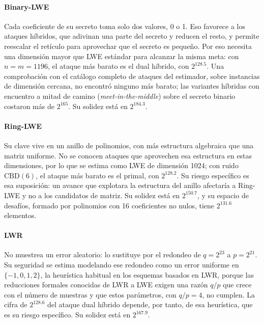 \paragraph{Binary-LWE}
Cada coeficiente de su secreto toma solo dos valores, 0 o 1. Eso favorece a los ataques híbridos, que adivinan una parte del secreto y reducen el resto, y permite reescalar el retículo para aprovechar que el secreto es pequeño. Por eso necesita una dimensión mayor que LWE estándar para alcanzar la misma meta: con $n = m = 1196$, el ataque más barato es el dual híbrido, con $2^{128.5}$. Una comprobación con el catálogo completo de ataques del estimador, sobre instancias de dimensión cercana, no encontró ninguno más barato; las variantes híbridas con encuentro a mitad de camino (\textit{meet-in-the-middle}) sobre el secreto binario costaron más de $2^{165}$. Su solidez está en $2^{184.3}$.

\paragraph{Ring-LWE}
Su clave vive en un anillo de polinomios, con más estructura algebraica que una matriz uniforme. No se conocen ataques que aprovechen esa estructura en estas dimensiones, por lo que se estima como LWE de dimensión 1024; con ruido $\mathrm{CBD}(6)$, el ataque más barato es el primal, con $2^{128.2}$. Su riesgo específico es esa suposición: un avance que explotara la estructura del anillo afectaría a Ring-LWE y no a los candidatos de matriz. Su solidez está en $2^{150.7}$, y su espacio de desafíos, formado por polinomios con 16 coeficientes no nulos, tiene $2^{131.6}$ elementos.

\paragraph{LWR}
No muestrea un error aleatorio: lo sustituye por el redondeo de $q = 2^{23}$ a $p = 2^{21}$. Su seguridad se estima modelando ese redondeo como un error uniforme en $\{-1, 0, 1, 2\}$, la heurística habitual en los esquemas basados en LWR, porque las reducciones formales conocidas de LWR a LWE exigen una razón $q/p$ que crece con el número de muestras y que estos parámetros, con $q/p = 4$, no cumplen. La cifra de $2^{128.6}$ del ataque dual híbrido depende, por tanto, de esa heurística, que es su riesgo específico. Su solidez está en $2^{167.9}$.

